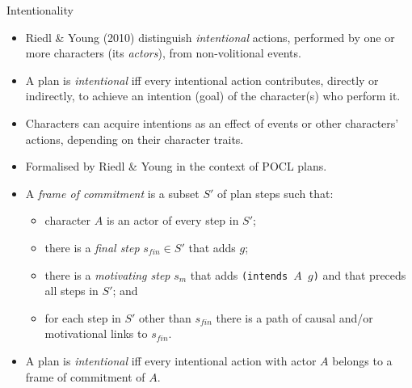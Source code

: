 \documentclass[utf8,13pt]{beamer}
\newcommand{\ptype}[1]{\texttt{#1}}
\begin{document}
\begin{frame}{Intentionality}
  \begin{itemize}
  \item Riedl \& Young (2010) distinguish \emph{intentional} actions,
    performed by one or more characters (its \emph{actors}), from
    non-volitional events.
  \item A plan is \emph{intentional} iff every intentional action
    contributes, directly or indirectly, to achieve an intention (goal)
    of the character(s) who perform it.
  \item Characters can acquire intentions as an effect of events or other
    characters' actions, depending on their character traits.
  \end{itemize}
\end{frame}

\begin{frame}
  \begin{itemize}
  \item Formalised by Riedl \& Young in the context of POCL plans.
  \item A \emph{frame of commitment} is a subset $S'$ of plan steps
    such that:
    \begin{itemize}
    \item character $A$ is an actor of every step in $S'$;
    \item there is a \emph{final step} $s_{fin} \in S'$ that adds $g$;
    \item there is a \emph{motivating step} $s_m$ that adds
      \ptype{(intends $A$ $g$)} and that preceds all steps in $S'$; and
    \item for each step in $S'$ other than $s_{fin}$ there is a path of
      causal and/or motivational links to $s_{fin}$.
    \end{itemize}
  \item A plan is \emph{intentional} iff every intentional action with
    actor $A$ belongs to a frame of commitment of $A$.
  \end{itemize}
\end{frame}
\end{document}

